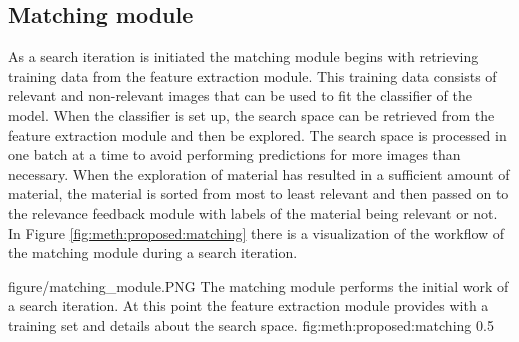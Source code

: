 \subsection{Matching module}
\label{sec:meth:proposed:matching}
As a search iteration is initiated the matching module begins with retrieving training data from the feature extraction module. This training data consists of relevant and non-relevant images that can be used to fit the classifier of the model. When the classifier is set up, the search space can be retrieved from the feature extraction module and then be explored. The search space is processed in one batch at a time to avoid performing predictions for more images than necessary. When the exploration of material has resulted in a sufficient amount of material, the material is sorted from most to least relevant and then passed on to the relevance feedback module with labels of the material being relevant or not. 
In Figure \ref{fig:meth:proposed:matching} there is a visualization of the workflow of the matching module during a search iteration. 

\singlefigure
{figure/matching_module.PNG}
{The matching module performs the initial work of a search iteration. At this point the feature extraction module provides with a training set and details about the search space.}
{fig:meth:proposed:matching}
{0.5}




